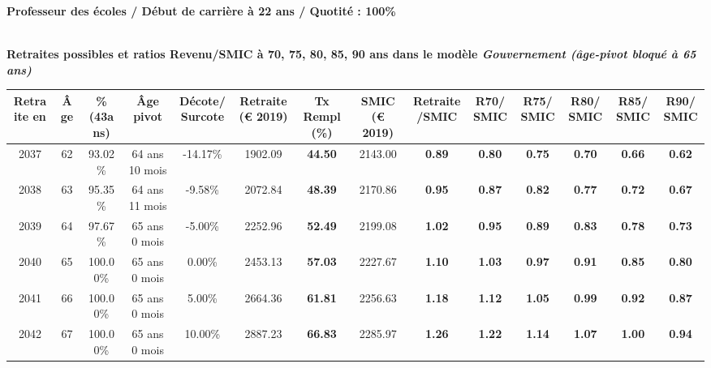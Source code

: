 {\bf \noindent Professeur des écoles / Début de carrière à 22 ans / Quotité : 100\%}  ~ 

 ~\\{\bf \noindent Retraites possibles et ratios Revenu/SMIC à 70, 75, 80, 85, 90 ans dans le modèle \emph{Gouvernement (âge-pivot bloqué à 65 ans)}}  
 
\begin{adjustbox}{max width=\textwidth} 
\begin{tabular}[htb]{|c|c||c|c|c||c|c||c|c||c|c|c|c|c|} 
\hline 
 Retraite en &  Âge &  \%(43ans) &  Âge pivot &  Décote/Surcote &  Retraite (\euro{} 2019) &  Tx Rempl(\%) &  SMIC (\euro{} 2019) &  Retraite/SMIC &  R70/SMIC &  R75/SMIC &  R80/SMIC &  R85/SMIC &  R90/SMIC \\ 
\hline \hline 
 2037 &  62 &  93.02\% &  64 ans 10 mois &  -14.17\% &  1902.09 &  {\bf 44.50} &  2143.00 &  {\bf {\color{red} 0.89}} &  {\bf {\color{red} 0.80}} &  {\bf {\color{red} 0.75}} &  {\bf {\color{red} 0.70}} &  {\bf {\color{red} 0.66}} &  {\bf {\color{red} 0.62}} \\ 
\hline 
 2038 &  63 &  95.35\% &  64 ans 11 mois &  -9.58\% &  2072.84 &  {\bf 48.39} &  2170.86 &  {\bf {\color{red} 0.95}} &  {\bf {\color{red} 0.87}} &  {\bf {\color{red} 0.82}} &  {\bf {\color{red} 0.77}} &  {\bf {\color{red} 0.72}} &  {\bf {\color{red} 0.67}} \\ 
\hline 
 2039 &  64 &  97.67\% &  65 ans 0 mois &  -5.00\% &  2252.96 &  {\bf 52.49} &  2199.08 &  {\bf 1.02} &  {\bf {\color{red} 0.95}} &  {\bf {\color{red} 0.89}} &  {\bf {\color{red} 0.83}} &  {\bf {\color{red} 0.78}} &  {\bf {\color{red} 0.73}} \\ 
\hline 
 2040 &  65 &  100.00\% &  65 ans 0 mois &  0.00\% &  2453.13 &  {\bf 57.03} &  2227.67 &  {\bf 1.10} &  {\bf 1.03} &  {\bf {\color{red} 0.97}} &  {\bf {\color{red} 0.91}} &  {\bf {\color{red} 0.85}} &  {\bf {\color{red} 0.80}} \\ 
\hline 
 2041 &  66 &  100.00\% &  65 ans 0 mois &  5.00\% &  2664.36 &  {\bf 61.81} &  2256.63 &  {\bf 1.18} &  {\bf 1.12} &  {\bf 1.05} &  {\bf {\color{red} 0.99}} &  {\bf {\color{red} 0.92}} &  {\bf {\color{red} 0.87}} \\ 
\hline 
 2042 &  67 &  100.00\% &  65 ans 0 mois &  10.00\% &  2887.23 &  {\bf 66.83} &  2285.97 &  {\bf 1.26} &  {\bf 1.22} &  {\bf 1.14} &  {\bf 1.07} &  {\bf 1.00} &  {\bf {\color{red} 0.94}} \\ 
\hline 
\hline 
\end{tabular} 
\end{adjustbox} 
 
